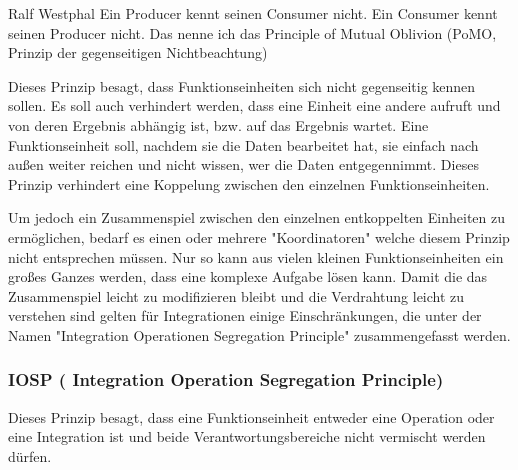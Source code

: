 \begin{aquote}{Ralf Westphal \cite[S. 80]{schummelzettel}}
	Ein Producer kennt seinen Consumer nicht. Ein Consumer kennt seinen Producer
	nicht. Das nenne ich das Principle of Mutual Oblivion (PoMO,
	Prinzip der gegenseitigen Nichtbeachtung) 
\end{aquote}




Dieses Prinzip besagt, dass Funktionseinheiten sich nicht gegenseitig kennen sollen.
Es soll auch verhindert werden, dass eine Einheit eine andere aufruft und von deren Ergebnis
abhängig ist, bzw. auf das Ergebnis wartet.
Eine Funktionseinheit soll, nachdem sie die Daten bearbeitet hat, sie einfach nach
außen weiter reichen und nicht wissen, wer die Daten entgegennimmt.
Dieses Prinzip verhindert eine Koppelung zwischen den einzelnen Funktionseinheiten.

Um jedoch ein Zusammenspiel zwischen den einzelnen entkoppelten Einheiten zu ermöglichen, bedarf es einen oder
mehrere "Koordinatoren" welche diesem Prinzip nicht entsprechen müssen.
Nur so kann aus vielen kleinen Funktionseinheiten ein großes Ganzes werden, dass eine komplexe Aufgabe lösen kann.
Damit die das Zusammenspiel leicht zu modifizieren bleibt und die Verdrahtung
leicht zu verstehen sind gelten für Integrationen einige Einschränkungen, die
unter der Namen "Integration Operationen Segregation Principle" zusammengefasst
werden.



\subsubsection{IOSP ( Integration Operation Segregation Principle)}


Dieses Prinzip besagt, dass eine Funktionseinheit entweder eine Operation oder eine Integration ist und beide
Verantwortungsbereiche nicht vermischt werden dürfen.

